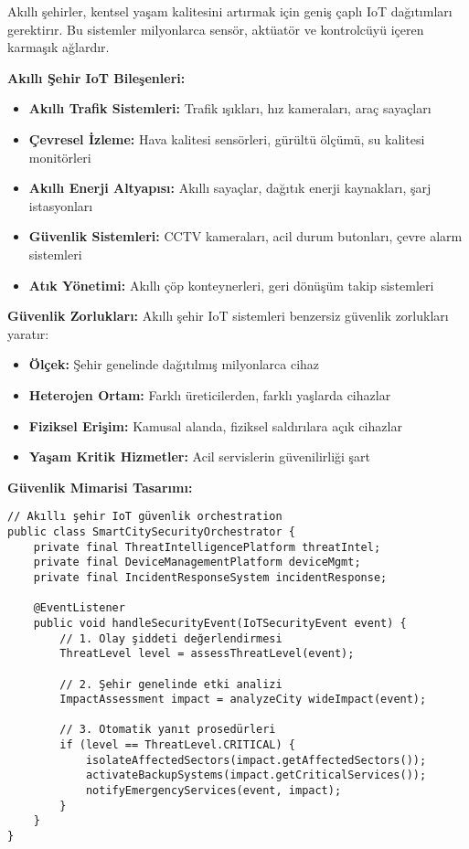 Akıllı şehirler, kentsel yaşam kalitesini artırmak için geniş çaplı IoT dağıtımları gerektirır. Bu sistemler milyonlarca sensör, aktüatör ve kontrolcüyü içeren karmaşık ağlardır.

\textbf{Akıllı Şehir IoT Bileşenleri:}
\begin{itemize}
    \item \textbf{Akıllı Trafik Sistemleri:} Trafik ışıkları, hız kameraları, araç sayaçları
    \item \textbf{Çevresel İzleme:} Hava kalitesi sensörleri, gürültü ölçümü, su kalitesi monitörleri
    \item \textbf{Akıllı Enerji Altyapısı:} Akıllı sayaçlar, dağıtık enerji kaynakları, şarj istasyonları
    \item \textbf{Güvenlik Sistemleri:} CCTV kameraları, acil durum butonları, çevre alarm sistemleri
    \item \textbf{Atık Yönetimi:} Akıllı çöp konteynerleri, geri dönüşüm takip sistemleri
\end{itemize}

\textbf{Güvenlik Zorlukları:}
Akıllı şehir IoT sistemleri benzersiz güvenlik zorlukları yaratır:
\begin{itemize}
    \item \textbf{Ölçek:} Şehir genelinde dağıtılmış milyonlarca cihaz
    \item \textbf{Heterojen Ortam:} Farklı üreticilerden, farklı yaşlarda cihazlar
    \item \textbf{Fiziksel Erişim:} Kamusal alanda, fiziksel saldırılara açık cihazlar
    \item \textbf{Yaşam Kritik Hizmetler:} Acil servislerin güvenilirliği şart
\end{itemize}

\textbf{Güvenlik Mimarisi Tasarımı:}
\begin{lstlisting}[breaklines=true,basicstyle=\ttfamily\footnotesize]
// Akıllı şehir IoT güvenlik orchestration
public class SmartCitySecurityOrchestrator {
    private final ThreatIntelligencePlatform threatIntel;
    private final DeviceManagementPlatform deviceMgmt;
    private final IncidentResponseSystem incidentResponse;
    
    @EventListener
    public void handleSecurityEvent(IoTSecurityEvent event) {
        // 1. Olay şiddeti değerlendirmesi
        ThreatLevel level = assessThreatLevel(event);
        
        // 2. Şehir genelinde etki analizi
        ImpactAssessment impact = analyzeCity wideImpact(event);
        
        // 3. Otomatik yanıt prosedürleri
        if (level == ThreatLevel.CRITICAL) {
            isolateAffectedSectors(impact.getAffectedSectors());
            activateBackupSystems(impact.getCriticalServices());
            notifyEmergencyServices(event, impact);
        }
    }
}
\end{lstlisting}

